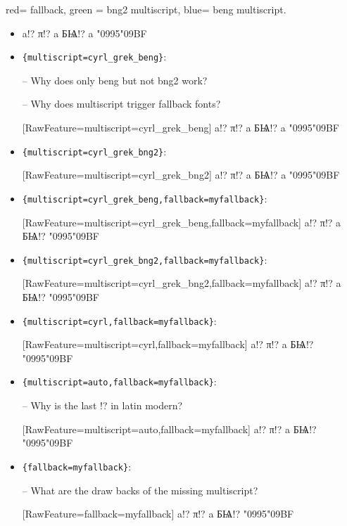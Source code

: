 \documentclass{article}
\begin{document}
red= fallback, green = bng2 multiscript, blue= beng multiscript.

\begin{itemize}
\item a!? π!? a БѨ!? a \char"0995\char"09BF

\item \verb+{multiscript=cyrl_grek_beng}+:

-- Why does only beng but not bng2 work?

-- Why does multiscript trigger fallback fonts?

[RawFeature={multiscript=cyrl_grek_beng}]
a!? π!? a БѨ!? a \char"0995\char"09BF

\item \verb+{multiscript=cyrl_grek_bng2}+:

[RawFeature={multiscript=cyrl_grek_bng2}]
a!? π!? a БѨ!? a \char"0995\char"09BF

\item \verb+{multiscript=cyrl_grek_beng,fallback=myfallback}+:

[RawFeature={multiscript=cyrl_grek_beng,fallback=myfallback}]
a!? π!? a БѨ!? \char"0995\char"09BF

\item \verb+{multiscript=cyrl_grek_bng2,fallback=myfallback}+:

[RawFeature={multiscript=cyrl_grek_bng2,fallback=myfallback}]
a!? π!? a БѨ!? \char"0995\char"09BF

\item \verb+{multiscript=cyrl,fallback=myfallback}+:

[RawFeature={multiscript=cyrl,fallback=myfallback}]
a!? π!? a БѨ!? \char"0995\char"09BF

\item \verb+{multiscript=auto,fallback=myfallback}+:

-- Why is the last !? in latin modern?

[RawFeature={multiscript=auto,fallback=myfallback}]
a!? π!? a БѨ!? \char"0995\char"09BF

\item \verb+{fallback=myfallback}+:

-- What are the draw backs of the missing multiscript?

[RawFeature={fallback=myfallback}]
a!? π!? a БѨ!? \char"0995\char"09BF


\end{itemize}
\end{document}
